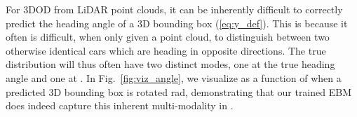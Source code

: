 \documentclass[letterpaper, 10 pt, conference]{ieeeconf}
\begin{document}
For 3DOD from LiDAR point clouds, it can be inherently difficult to correctly predict the heading angle  of a 3D bounding box  (\ref{eq:y_def}). This is because it often is difficult, when only given a point cloud, to distinguish between two otherwise identical cars which are heading in opposite directions. The true distribution  will thus often have two distinct modes, one at the true heading angle  and one at . In Fig.~\ref{fig:viz_angle}, we visualize  as a function of  when a predicted 3D bounding box  is rotated  rad, demonstrating that our trained EBM  does indeed capture this inherent multi-modality in .

\begin{figure}[t]
    \centering
\end{figure}
\end{document}
